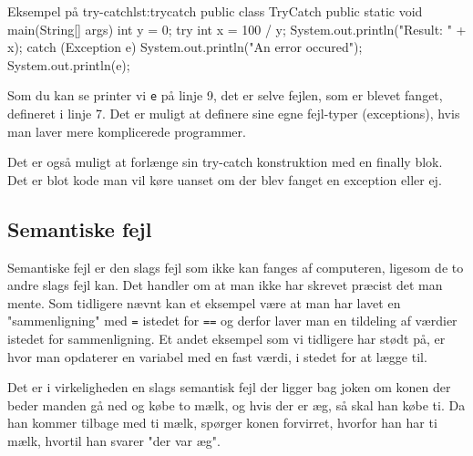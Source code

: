 \begin{JavaCode}{Eksempel på try-catch}{lst:trycatch}
	public class TryCatch {
		public static void main(String[] args) {
			int y = 0;
			try {
				int x = 100 / y;
				System.out.println("Result: " + x); 
			} catch (Exception e) {
				System.out.println("An error occured");
				System.out.println(e);
			}
		}
	}
	
\end{JavaCode}

\begin{remark}
	Som du kan se printer vi \texttt{e} på linje 9, det er selve fejlen, som er blevet fanget, defineret i linje 7. Det er muligt at definere sine egne fejl-typer (exceptions), hvis man laver mere komplicerede programmer.
	
	Det er også muligt at forlænge sin try-catch konstruktion med en finally blok. Det er blot kode man vil køre uanset om der blev fanget en exception eller ej.
\end{remark}

\subsection{Semantiske fejl}
Semantiske fejl er den slags fejl som ikke kan fanges af computeren, ligesom de to andre slags fejl kan. Det handler om at man ikke har skrevet præcist det man mente. Som tidligere nævnt kan et eksempel være at man har lavet en "sammenligning" med \texttt{=} istedet for \texttt{==} og derfor laver man en tildeling af værdier istedet for sammenligning. Et andet eksempel som vi tidligere har stødt på, er hvor man opdaterer en variabel med en fast værdi, i stedet for at lægge til. 

Det er i virkeligheden en slags semantisk fejl der ligger bag joken om konen der beder manden gå ned og købe to mælk, og hvis der er æg, så skal han købe ti. Da han kommer tilbage med ti mælk, spørger konen forvirret, hvorfor han har ti mælk, hvortil han svarer "der var æg".